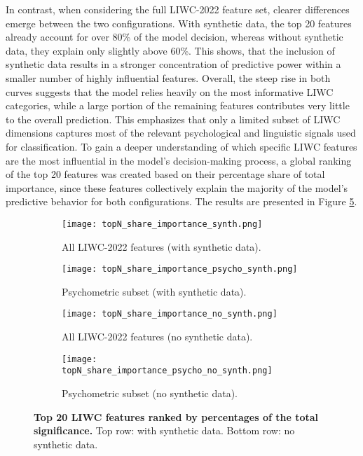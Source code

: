 In contrast, when considering the full LIWC-2022 feature set, clearer differences emerge between the two configurations. With synthetic data, the top 20 features already account for over 80\% of the model decision, whereas without synthetic data, they explain only slightly above 60\%. This shows, that the inclusion of synthetic data results in a stronger concentration of predictive power within a smaller number of highly influential features. Overall, the steep rise in both curves suggests that the model relies heavily on the most informative LIWC categories, while a large portion of the remaining features contributes very little to the overall prediction. This emphasizes that only a limited subset of LIWC dimensions captures most of the relevant psychological and linguistic signals used for classification. To gain a deeper understanding of which specific LIWC features are the most influential in the model's decision-making process, a global ranking of the top 20 features was created based on their percentage share of total importance, since these features collectively explain the majority of the model’s predictive behavior for both configurations. The results are presented in Figure \ref{fig:global_feature_importance_combined}.

\begin{figure}[H]
  \centering
  
  \begin{subfigure}[t]{0.49\textwidth}
    \centering
    \texttt{[image: topN\_share\_importance\_synth.png]}
    \caption{All LIWC-2022 features (with synthetic data).}
    \label{fig:synth_all}
  \end{subfigure}\hfill
  \begin{subfigure}[t]{0.49\textwidth}
    \centering
    \texttt{[image: topN\_share\_importance\_psycho\_synth.png]}
    \caption{Psychometric subset (with synthetic data).}
    \label{fig:synth_psycho}
  \end{subfigure}
  
  \vspace{0.5cm}
  

  \begin{subfigure}[t]{0.49\textwidth}
    \centering
    \texttt{[image: topN\_share\_importance\_no\_synth.png]}
    \caption{All LIWC-2022 features (no synthetic data).}
    \label{fig:no_synth_all}
  \end{subfigure}\hfill
  \begin{subfigure}[t]{0.49\textwidth}
    \centering
    \texttt{[image: topN\_share\_importance\_psycho\_no\_synth.png]}
    \caption{Psychometric subset (no synthetic data).}
    \label{fig:no_synth_psycho}
  \end{subfigure}

  \caption[Top 20 LIWC features ranked by percentages of the total significance.]{\textbf{Top 20 LIWC features ranked by percentages of the total significance.} 
  Top row: with synthetic data. Bottom row: no synthetic data.}
  \label{fig:global_feature_importance_combined}
\end{figure}

